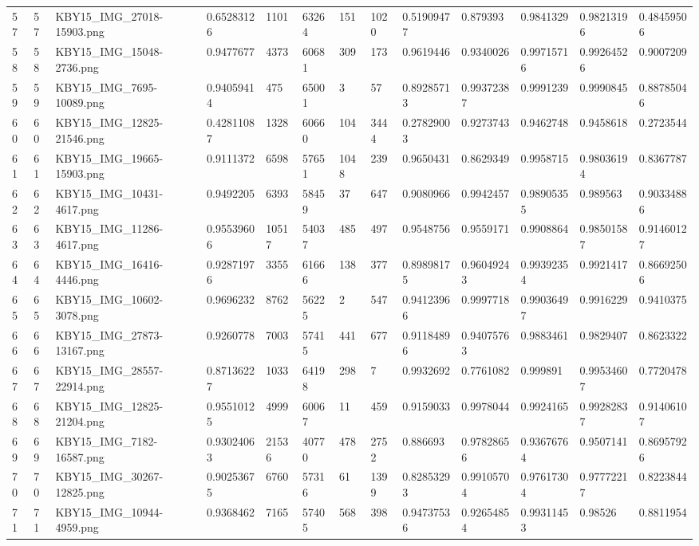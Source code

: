 \documentclass[11pt, a4paper, twoside]{report}
\begin{document}
\begin{longtable}[c]{@{}lllllllllllll@{}}
57 & 57 & KBY15\_IMG\_27018-15903.png & 0.65283126 & 1101 & 63264 & 151 & 1020 & 0.51909477 & 0.879393 & 0.9841329 & 0.98213196 & 0.48459506 \\
58 & 58 & KBY15\_IMG\_15048-2736.png & 0.9477677 & 4373 & 60681 & 309 & 173 & 0.9619446 & 0.9340026 & 0.99715716 & 0.99264526 & 0.9007209 \\
59 & 59 & KBY15\_IMG\_7695-10089.png & 0.94059414 & 475 & 65001 & 3 & 57 & 0.89285713 & 0.99372387 & 0.9991239 & 0.9990845 & 0.88785046 \\
60 & 60 & KBY15\_IMG\_12825-21546.png & 0.42811087 & 1328 & 60660 & 104 & 3444 & 0.27829003 & 0.9273743 & 0.9462748 & 0.9458618 & 0.2723544 \\
61 & 61 & KBY15\_IMG\_19665-15903.png & 0.9111372 & 6598 & 57651 & 1048 & 239 & 0.9650431 & 0.8629349 & 0.9958715 & 0.98036194 & 0.8367787 \\
62 & 62 & KBY15\_IMG\_10431-4617.png & 0.9492205 & 6393 & 58459 & 37 & 647 & 0.9080966 & 0.9942457 & 0.98905355 & 0.989563 & 0.90334886 \\
63 & 63 & KBY15\_IMG\_11286-4617.png & 0.95539606 & 10517 & 54037 & 485 & 497 & 0.9548756 & 0.9559171 & 0.9908864 & 0.98501587 & 0.91460127 \\
64 & 64 & KBY15\_IMG\_16416-4446.png & 0.92871976 & 3355 & 61666 & 138 & 377 & 0.89898175 & 0.96049243 & 0.99392354 & 0.9921417 & 0.86692506 \\
65 & 65 & KBY15\_IMG\_10602-3078.png & 0.9696232 & 8762 & 56225 & 2 & 547 & 0.94123966 & 0.9997718 & 0.99036497 & 0.9916229 & 0.9410375 \\
66 & 66 & KBY15\_IMG\_27873-13167.png & 0.9260778 & 7003 & 57415 & 441 & 677 & 0.91184896 & 0.94075763 & 0.9883461 & 0.9829407 & 0.8623322 \\
67 & 67 & KBY15\_IMG\_28557-22914.png & 0.87136227 & 1033 & 64198 & 298 & 7 & 0.9932692 & 0.7761082 & 0.999891 & 0.99534607 & 0.7720478 \\
68 & 68 & KBY15\_IMG\_12825-21204.png & 0.95510125 & 4999 & 60067 & 11 & 459 & 0.9159033 & 0.9978044 & 0.9924165 & 0.99282837 & 0.91406107 \\
69 & 69 & KBY15\_IMG\_7182-16587.png & 0.93024063 & 21536 & 40770 & 478 & 2752 & 0.886693 & 0.97828656 & 0.93676764 & 0.9507141 & 0.86957926 \\
70 & 70 & KBY15\_IMG\_30267-12825.png & 0.90253675 & 6760 & 57316 & 61 & 1399 & 0.82853293 & 0.99105704 & 0.97617304 & 0.97772217 & 0.8223844 \\
71 & 71 & KBY15\_IMG\_10944-4959.png & 0.9368462 & 7165 & 57405 & 568 & 398 & 0.94737536 & 0.92654854 & 0.99311453 & 0.98526 & 0.8811954 \\

\end{longtable}
\end{document}
